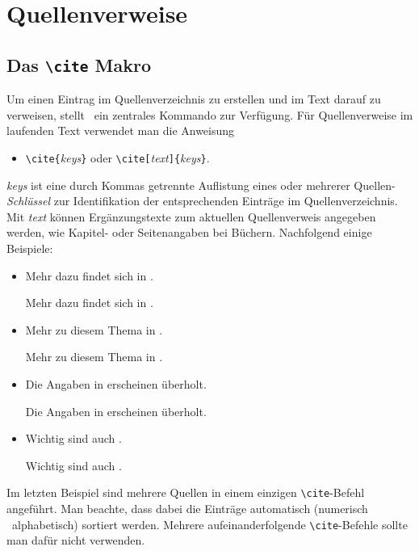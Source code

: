 \section{Quellenverweise}



\subsection{Das \texttt{\textbackslash cite} Makro}

Um einen Eintrag im Quellenverzeichnis zu erstellen und im Text darauf zu
verweisen, stellt \latex\ ein zentrales Kommando zur Verfügung.
Für Quellenverweise im laufenden Text verwendet man die Anweisung
%
\begin{itemize}
\item[] \verb!\cite{!\textit{keys}\verb!}!
				\quad oder \quad
        \verb!\cite[!\textit{text}\verb!]{!\textit{keys}\verb!}!.
\end{itemize}
%
\textit{keys} ist eine durch Kommas getrennte Auflistung eines oder mehrerer
Quellen-\emph{Schlüssel} zur Identifikation der entsprechenden Einträge im
Quellenverzeichnis. Mit \textit{text} können Ergänzungstexte zum aktuellen
Quellenverweis angegeben werden, wie \zB Kapitel- oder Seitenangaben bei
Büchern. Nachfolgend einige Beispiele:
%
\begin{itemize}
    \item Mehr dazu findet sich in \cite{Kopka2003}.
\begin{LaTeXCode}[numbers=none]
Mehr dazu findet sich in \cite{Kopka2003}.
\end{LaTeXCode}
%
    \item Mehr zu diesem Thema in \cite[Kap.~3]{Kopka2003}.
\begin{LaTeXCode}[numbers=none]
Mehr zu diesem Thema in \cite[Kap.~3]{Kopka2003}.
\end{LaTeXCode}
%
    \item Die Angaben in \cite[S.\ 274--277]{BurgeBurger1999} erscheinen überholt.
\begin{LaTeXCode}[numbers=none]
Die Angaben in \cite[S.\ 274--277]{BurgeBurger1999} erscheinen überholt.
\end{LaTeXCode}
%
    \item Wichtig sind auch \cite{Patashnik1988,Feder2006,Duden1997}.
\begin{LaTeXCode}[numbers=none]
Wichtig sind auch \cite{Patashnik1988,Feder2006,Duden1997}.
\end{LaTeXCode}
\end{itemize}
%
Im letzten Beispiel sind mehrere Quellen in einem einzigen
\texttt{\textbackslash cite}-Befehl angeführt. Man beachte, dass dabei die
Einträge automatisch (numerisch \bzw\ alphabetisch) sortiert werden. Mehrere
aufeinanderfolgende \texttt{\textbackslash cite}-Befehle sollte man dafür
nicht verwenden.

